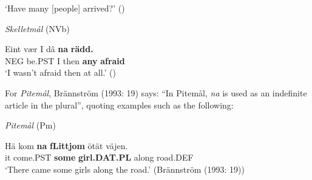 \glt ‘Have many [people] arrived?’ (\citet[43]{Marklund1976})

\z

\item 

\textit{Skelletmål} (NVb)



 \ea\label{}
\gll Eint  vær  I  dâ  \textbf{na} \textbf{rädd.}\\


NEG  be.PST  I  then  \textbf{any} \textbf{afraid}\\

\glt ‘I wasn’t afraid then at all.’ (\citet[43]{Marklund1976})

\z

For \textit{Pitemål}, Brännström (1993: 19) says: “In Pitemål, \textit{na} is used as an indefinite article in the plural”, quoting examples such as the following:


\item 

\textit{Pitemål }(Pm)



\item 


 \ea\label{}
\gll Hä  kom  \textbf{na}\textbf{  fLi{\textasciigrave}ttjom} ötät  väjen.\\


it  come.PST  \textbf{some} \textbf{girl.DAT.PL} along  road.DEF\\

\glt ‘There came some girls along the road.’ (Brännström (1993: 19))

